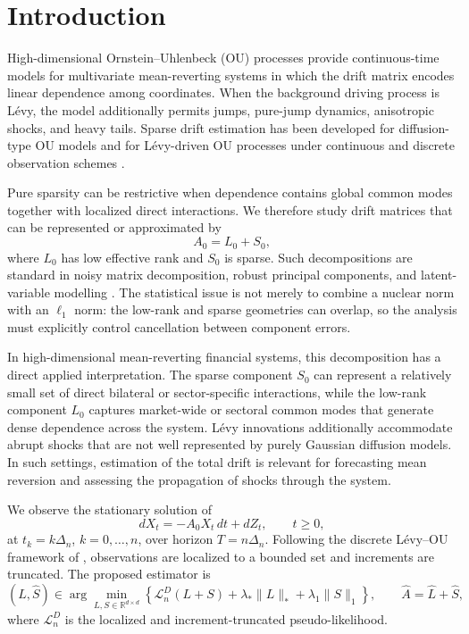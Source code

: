 \documentclass[12pt]{article}
\theoremstyle{definition}
\begin{document}
	\section{Introduction}
	
	High-dimensional Ornstein--Uhlenbeck (OU) processes provide continuous-time models for multivariate mean-reverting systems in which the drift matrix encodes linear dependence among coordinates. When the background driving process is L\'evy, the model additionally permits jumps, pure-jump dynamics, anisotropic shocks, and heavy tails. Sparse drift estimation has been developed for diffusion-type OU models \citep{GaiffasMatulewicz2019,CiolekMarushkevychPodolskij2020} and for L\'evy-driven OU processes under continuous and discrete observation schemes \citep{DexheimerStrauch2024,DexheimerJeszka2026}.
	
	Pure sparsity can be restrictive when dependence contains global common modes together with localized direct interactions. We therefore study drift matrices that can be represented or approximated by
	\[A_0=L_0+S_0,\]
	where $L_0$ has low effective rank and $S_0$ is sparse. Such decompositions are standard in noisy matrix decomposition, robust principal components, and latent-variable modelling \citep{ChandrasekaranSanghaviParriloWillsky2011,AgarwalNegahbanWainwright2012}. The statistical issue is not merely to combine a nuclear norm with an $\ell_1$ norm: the low-rank and sparse geometries can overlap, so the analysis must explicitly control cancellation between component errors.
	
	In high-dimensional mean-reverting financial systems, this decomposition has a direct applied interpretation. The sparse component $S_0$ can represent a relatively small set of direct bilateral or sector-specific interactions, while the low-rank component $L_0$ captures market-wide or sectoral common modes that generate dense dependence across the system. L\'evy innovations additionally accommodate abrupt shocks that are not well represented by purely Gaussian diffusion models. In such settings, estimation of the total drift is relevant for forecasting mean reversion and assessing the propagation of shocks through the system.
	
	We observe the stationary solution of
	\begin{equation}
		dX_t=-A_0X_t\,dt+dZ_t,\qquad t\ge0, \label{eq:ou}
	\end{equation}
	at $t_k=k\Delta_n$, $k=0,\ldots,n$, over horizon $T=n\Delta_n$. Following the discrete L\'evy--OU framework of \citet{DexheimerJeszka2026}, observations are localized to a bounded set and increments are truncated. The proposed estimator is
	\begin{equation}
		(\widehat L,\widehat S)\in \arg\min_{L,S\in\mathbb R^{d\times d}} \left\{ \mathcal L_n^D(L+S)+\lambda_*\|L\|_*+\lambda_1\|S\|_1 \right\},
		\qquad \widehat A=\widehat L+\widehat S, \label{eq:estimator_intro}
	\end{equation}
	where $\mathcal L_n^D$ is the localized and increment-truncated pseudo-likelihood.
	
\end{document}
